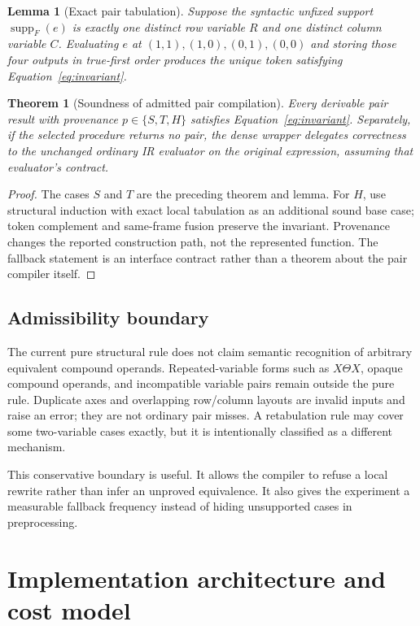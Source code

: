 \documentclass[10pt]{article}
\newcommand{\supp}{\operatorname{supp}}
\theoremstyle{plain}
\newtheorem{theorem}{Theorem}
\newtheorem{lemma}{Lemma}
\theoremstyle{definition}
\theoremstyle{remark}
\begin{document}
\begin{lemma}[Exact pair tabulation]
Suppose the syntactic unfixed support $\supp_F(e)$ is exactly one distinct row variable $R$ and one distinct column variable $C$. Evaluating $e$ at $(1,1),(1,0),(0,1),(0,0)$ and storing those four outputs in true-first order produces the unique token satisfying Equation~\eqref{eq:invariant}.
\end{lemma}

\begin{theorem}[Soundness of admitted pair compilation]
Every derivable pair result with provenance $p\in\{S,T,H\}$ satisfies Equation~\eqref{eq:invariant}. Separately, if the selected procedure returns no pair, the dense wrapper delegates correctness to the unchanged ordinary IR evaluator on the original expression, assuming that evaluator's contract.
\end{theorem}

\begin{proof}
The cases $S$ and $T$ are the preceding theorem and lemma. For $H$, use structural induction with exact local tabulation as an additional sound base case; token complement and same-frame fusion preserve the invariant. Provenance changes the reported construction path, not the represented function. The fallback statement is an interface contract rather than a theorem about the pair compiler itself.
\end{proof}

\subsection{Admissibility boundary}

The current pure structural rule does not claim semantic recognition of arbitrary equivalent compound operands. Repeated-variable forms such as $X\Theta X$, opaque compound operands, and incompatible variable pairs remain outside the pure rule. Duplicate axes and overlapping row/column layouts are invalid inputs and raise an error; they are not ordinary pair misses. A retabulation rule may cover some two-variable cases exactly, but it is intentionally classified as a different mechanism.

This conservative boundary is useful. It allows the compiler to refuse a local rewrite rather than infer an unproved equivalence. It also gives the experiment a measurable fallback frequency instead of hiding unsupported cases in preprocessing.

\section{Implementation architecture and cost model}
\label{sec:implementation}
\end{document}
